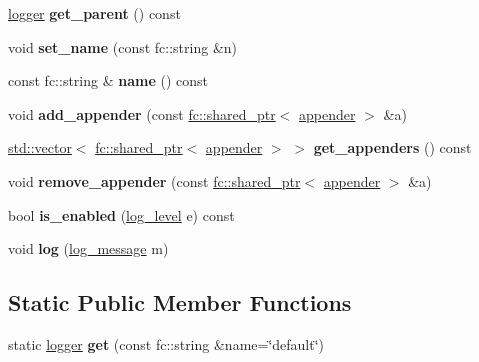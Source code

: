 \begin{DoxyCompactItemize}
\item 
\mbox{\label{classfc_1_1logger_a2d94a15c5f6573dc2a30828d3bb5b756}} 
\mbox{\hyperlink{classfc_1_1logger}{logger}} {\bfseries get\+\_\+parent} () const
\item 
\mbox{\label{classfc_1_1logger_a8e05d4d63c46991db440482752af9fd8}} 
void {\bfseries set\+\_\+name} (const fc\+::string \&n)
\item 
\mbox{\label{classfc_1_1logger_ad8267d78496b4a3241148afd11fa2e03}} 
const fc\+::string \& {\bfseries name} () const
\item 
\mbox{\label{classfc_1_1logger_aed07a4668f7c47dec78b5f18242ba754}} 
void {\bfseries add\+\_\+appender} (const \mbox{\hyperlink{classfc_1_1shared__ptr}{fc\+::shared\+\_\+ptr}}$<$ \mbox{\hyperlink{classfc_1_1appender}{appender}} $>$ \&a)
\item 
\mbox{\label{classfc_1_1logger_a20670b77096a34f479a3375444b85da5}} 
\mbox{\hyperlink{classstd_1_1vector}{std\+::vector}}$<$ \mbox{\hyperlink{classfc_1_1shared__ptr}{fc\+::shared\+\_\+ptr}}$<$ \mbox{\hyperlink{classfc_1_1appender}{appender}} $>$ $>$ {\bfseries get\+\_\+appenders} () const
\item 
\mbox{\label{classfc_1_1logger_a23a3f1f8bb6ef9a16a7acb80ee5db984}} 
void {\bfseries remove\+\_\+appender} (const \mbox{\hyperlink{classfc_1_1shared__ptr}{fc\+::shared\+\_\+ptr}}$<$ \mbox{\hyperlink{classfc_1_1appender}{appender}} $>$ \&a)
\item 
\mbox{\label{classfc_1_1logger_afbae9b6cd7f4f604f654a4c1914677ac}} 
bool {\bfseries is\+\_\+enabled} (\mbox{\hyperlink{classfc_1_1log__level}{log\+\_\+level}} e) const
\item 
\mbox{\label{classfc_1_1logger_a8699bbd7c059f568f456b1446b97b0e4}} 
void {\bfseries log} (\mbox{\hyperlink{classfc_1_1log__message}{log\+\_\+message}} m)
\end{DoxyCompactItemize}
\subsection*{Static Public Member Functions}
\begin{DoxyCompactItemize}
\item 
\mbox{\label{classfc_1_1logger_ac325a78987cb4bc35d9e1080c5ad0bc0}} 
static \mbox{\hyperlink{classfc_1_1logger}{logger}} {\bfseries get} (const fc\+::string \&name=\char`\"{}default\char`\"{})
\end{DoxyCompactItemize}
